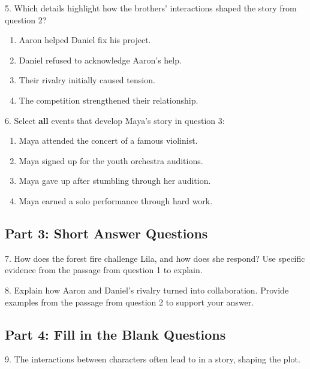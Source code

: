 \documentclass[12pt]{article}
\begin{document}
\vspace{1cm}

5. Which details highlight how the brothers’ interactions shaped the story from question 2?  
\begin{enumerate}[label=\Alph*.]
    \item Aaron helped Daniel fix his project.  
    \item Daniel refused to acknowledge Aaron’s help.  
    \item Their rivalry initially caused tension.  
    \item The competition strengthened their relationship.  
\end{enumerate}

\vspace{1cm}

6. Select \textbf{all} events that develop Maya’s story in question 3:  
\begin{enumerate}[label=\Alph*.]
    \item Maya attended the concert of a famous violinist.  
    \item Maya signed up for the youth orchestra auditions.  
    \item Maya gave up after stumbling through her audition.  
    \item Maya earned a solo performance through hard work.  
\end{enumerate}

\vspace{1cm}
\newpage
\subsection*{Part 3: Short Answer Questions}

7. How does the forest fire challenge Lila, and how does she respond? Use specific evidence from the passage from question 1 to explain.  
\vspace{4cm}

8. Explain how Aaron and Daniel’s rivalry turned into collaboration. Provide examples from the passage from question 2 to support your answer.  
\vspace{4cm}

\subsection*{Part 4: Fill in the Blank Questions}
\vspace{1cm}
9. The interactions between characters often lead to \underline{\hspace{4cm}} in a story, shaping the plot.  
\vspace{2cm}
\end{document}
